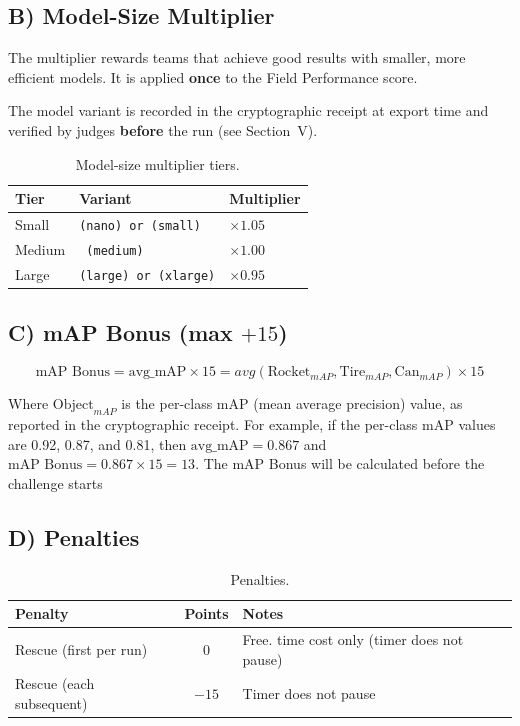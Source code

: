 \documentclass[a4]{article}
\begin{document}
\subsection*{B) Model-Size Multiplier}

The multiplier rewards teams that achieve good results with smaller, more efficient models. It is applied \textbf{once} to the Field Performance score.

The model variant is recorded in the cryptographic receipt at export time and verified by judges \textbf{before} the run (see Section~V).

\begin{table}[H]
\centering
\begin{tabular}{lll}
\toprule
\textbf{Tier} & \textbf{Variant} & \textbf{Multiplier} \\
\midrule
Small & \texttt{(nano) or (small)} & $\times 1.05$ \\
Medium & \texttt{ (medium) }& $\times 1.00$ \\
Large & \texttt{(large) or (xlarge)} & $\times 0.95$ \\
\bottomrule
\end{tabular}
\caption{Model-size multiplier tiers.}
\end{table}



\subsection*{C) mAP Bonus (max $+15$)}

\begin{equation*}
\text{mAP Bonus} = \text{avg\_mAP} \times 15 =  avg(\text{Rocket}_{mAP}, \text{Tire}_{mAP}, \text{Can}_{mAP}) \times 15
\end{equation*}

Where $\text{Object}_{mAP}$ is the  per-class mAP (mean average precision) value, as reported in the cryptographic receipt. For example, if the per-class mAP values are 0.92, 0.87, and 0.81, then $\text{avg\_mAP} = 0.867$ and $\text{mAP Bonus} = 0.867 \times 15 = 13$. The mAP Bonus will be calculated before the challenge starts

\subsection*{D) Penalties}

\begin{table}[H]
\centering
\begin{tabular}{lcp{6.5cm}}
\toprule
\textbf{Penalty} & \textbf{Points} & \textbf{Notes} \\
\midrule
Rescue (first per run) & $0$ & Free. time cost only (timer does not pause) \\
Rescue (each subsequent) & $-15$ & Timer does not pause \\
\bottomrule
\end{tabular}
\caption{Penalties.}
\end{table}
\end{document}
